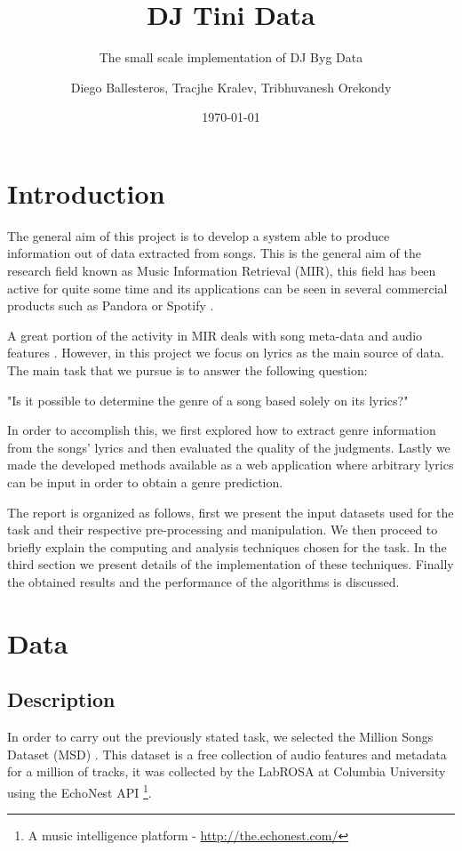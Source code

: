 \documentclass[11pt,a4paper,twoside]{scrartcl}
\author{Diego Ballesteros, Tracjhe Kralev, Tribhuvanesh Orekondy}
\title{DJ Tini Data}
\subtitle{The small scale implementation of DJ Byg Data}
\date{\today}
\begin{document}
  \maketitle
  \section{Introduction}
    The general aim of this project is to develop a system able to produce
    information out of data extracted from songs. This is the general
    aim of the research field known as Music Information Retrieval (MIR),
    this field has been active for quite some time \cite{nameThatTune:1993}
    and its applications can be seen in several commercial products such as
    Pandora or Spotify \cite{recommendation:2010}.

    A great portion of the activity in MIR deals with song meta-data and audio
    features \cite{McFee:2012:MSD:2187980.2188222}. However, in this project we
    focus on lyrics as the main source of data.
    The main task that we pursue is to answer the following question:
    
    "Is it possible to determine the genre of a song based solely on its
    lyrics?"
     
    In order to accomplish this, we first explored how to extract genre
    information from the songs' lyrics and then evaluated the quality of the
    judgments. Lastly we made the developed methods available as a web
    application where arbitrary lyrics can be input in order to obtain
    a genre prediction.
    
    The report is organized as follows, first we present the input datasets used
    for the task and their respective pre-processing and manipulation. We then
    proceed to briefly explain the computing and analysis techniques chosen for
    the task. In the third section we present details of the implementation of
    these techniques. Finally the obtained results and the performance of the
    algorithms is discussed.
  \section{Data}
  
    \subsection{Description} \label{sec:data:subsec:description}
    In order to carry out the previously stated task, we selected the Million
    Songs Dataset (MSD) \cite{Bertin-Mahieux2011}.
    This dataset is a free collection of audio features and metadata for a million
    of tracks, it was collected by the LabROSA at Columbia University using
    the EchoNest API
    \footnote{A music intelligence platform - \url{http://the.echonest.com/}}.
    
\end{document}
